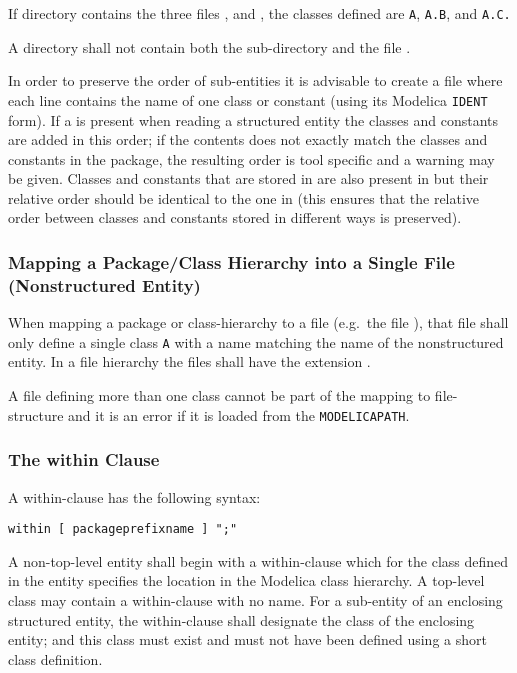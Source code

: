 \begin{example}
If directory  contains the three files ,  and , the classes defined are \lstinline!A!,
\lstinline!A.B!, and \lstinline!A.C.!
\end{example}

\begin{example}
A directory shall not contain both the sub-directory  and the file .
\end{example}

In order to preserve the order of sub-entities it is advisable to create
a file  where each line contains the name of one class or
constant (using its Modelica \lstinline!IDENT! form). If a  is present when reading a structured entity
the classes and constants are added in this order; if the contents does
not exactly match the classes and constants in the package, the
resulting order is tool specific and a warning may be given. Classes and
constants that are stored in  are also present in
 but their relative order should be identical to the one in
 (this ensures that the relative order between classes and
constants stored in different ways is preserved).

\subsubsection{Mapping a Package/Class Hierarchy into a Single File (Nonstructured Entity)}

When mapping a package or class-hierarchy to a file (e.g.\ the file ), that file shall only define a single class \lstinline!A! with a
name matching the name of the nonstructured entity. In a file hierarchy the files shall have the extension .

A  file defining more than one class cannot be part of the mapping
to file-structure and it is an error if it is loaded from the
\lstinline!MODELICAPATH!.

\subsubsection{The within Clause}

A within-clause has the following syntax:
\begin{lstlisting}[language=grammar]
  within [ packageprefixname ] ";"
\end{lstlisting}
  A non-top-level entity shall begin with a within-clause which for the
  class defined in the entity specifies the location in the Modelica class
    hierarchy. A top-level class may contain a within-clause with no name.
    For a sub-entity of an enclosing structured entity, the within-clause
shall designate the class of the enclosing entity; and this class must
exist and must not have been defined using a short class definition.

